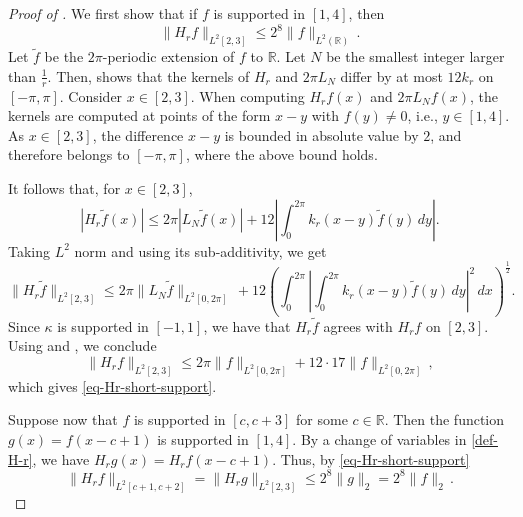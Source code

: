 \documentclass[10pt,a4paper]{article}
\theoremstyle{plain}
\theoremstyle{definition}
\numberwithin{equation}{subsection}
\newcommand{\R}{{\mathbb{R}}}
\newcommand{\proves}[1]{}
\newcommand{\leanok}{}
\begin{document}
\begin{proof}[Proof of ]
    \proves{Hilbert-strong-2-2}
    \leanok
    We first show that if $f$ is supported in $[1, 4]$, then
    \begin{equation}
        \label{eq-Hr-short-support}
        \|H_r f\|_{L^2[2, 3]} \le 2^{8} \|f\|_{L^2(\R)}\,.
    \end{equation}
    Let $\tilde{f}$ be the $2\pi$-periodic extension of $f$ to $\mathbb{R}$. Let $N$ be the smallest
    integer larger than $\frac 1r$. Then,  shows that the kernels of $H_r$ and $2\pi L_N$ differ by at
    most $12k_r$ on $[-\pi, \pi]$. Consider $x \in [2,3]$. When computing $H_r f(x)$ and $2\pi L_N f(x)$, the kernels are
    computed at points of the form $x-y$ with $f(y) \ne 0$, i.e., $y \in [1,4]$. As $x\in [2,3]$, the difference
    $x-y$ is bounded in absolute value by $2$, and therefore belongs to $[-\pi, \pi]$, where the above bound holds.

    It follows that, for $x \in [2,3]$,
    \begin{equation*}
        |H_r \tilde{f}(x)|\leq 2\pi |L_N \tilde{f}(x)|+12\left|\int_{0}^{2\pi}k_r(x-y)\tilde{f}(y)\, dy\right|.
    \end{equation*}
    Taking $L^2$ norm and using its sub-additivity, we get
    \begin{equation*}
       \|H_r \tilde{f}\|_{L^2[2, 3]}\leq 2\pi \|L_N \tilde{f}\|_{L^2[0, 2\pi]}\, + 12\left(\int_{0}^{2\pi} \left|\int_{0}^{2\pi}k_r(x-y)\tilde{f}(y)\, dy\right|^2\, dx\right)^{\frac{1}{2}}.
    \end{equation*}
    Since $\kappa$ is supported in $[-1,1]$, we have that $H_r\tilde{f}$ agrees with $H_r f$ on $[2,3]$.
    Using  and , we conclude
    \begin{equation}
        \|H_r f\|_{L^2[2, 3]} \le 2\pi \|f\|_{L^2[0, 2\pi]} + 12 \cdot 17 \|f\|_{L^2[0, 2\pi]}\,,
    \end{equation}
    which gives \eqref{eq-Hr-short-support}.

    Suppose now that $f$ is supported in $[c, c+3]$ for some $c \in \R$. Then the function $g(x) = f(x-c+1)$ is supported in $[1, 4]$.
    By a change of variables in \eqref{def-H-r}, we have $H_r g(x ) = H_r f(x - c + 1)$. Thus, by \eqref{eq-Hr-short-support}
    \begin{equation}
        \label{eq-Hr-short-support-2}
        \|H_rf\|_{L^2[c+1, c+2]} = \|H_r g\|_{L^2[2,3]} \le 2^{8} \|g\|_2 = 2^8 \|f\|_2\,.
    \end{equation}


\end{proof}
\end{document}
